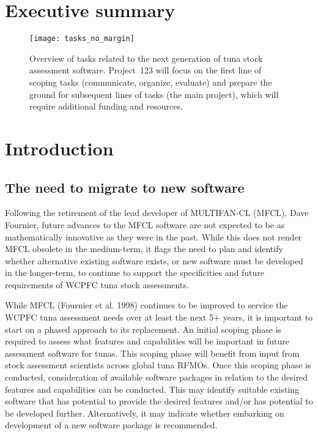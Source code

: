\documentclass{SCreport}
\begin{document}
\wcpfctitlepage

\tableofcontents
\newpage

\section{Executive summary}

\begin{figure}[H]
  \centering
  \texttt{[image: tasks\_no\_margin]}
  \vspace{-1ex}
  \caption{Overview of tasks related to the next generation of tuna stock
    assessment software. Project~123 will focus on the first line of scoping
    tasks (communicate, organize, evaluate) and prepare the ground for
    subsequent lines of tasks (the main project), which will require additional
    funding and resources.}
\end{figure}

\section{Introduction}

\subsection{The need to migrate to new software}

Following the retirement of the lead developer of MULTIFAN-CL (MFCL), Dave
Fournier, future advances to the MFCL software are not expected to be as
mathematically innovative as they were in the past. While this does not render
MFCL obsolete in the medium-term, it flags the need to plan and identify whether
alternative existing software exists, or new software must be developed in the
longer-term, to continue to support the specificities and future requirements of
WCPFC tuna stock assessments.

While MFCL (Fournier et al. 1998) continues to be improved to service the WCPFC
tuna assessment needs over at least the next 5+ years, it is important to start
on a phased approach to its replacement. An initial scoping phase is required to
assess what features and capabilities will be important in future assessment
software for tunas. This scoping phase will benefit from input from stock
assessment scientists across global tuna RFMOs. Once this scoping phase is
conducted, consideration of available software packages in relation to the
desired features and capabilities can be conducted. This may identify suitable
existing software that has potential to provide the desired features and/or has
potential to be developed further. Alternatively, it may indicate whether
embarking on development of a new software package is recommended.
\end{document}
